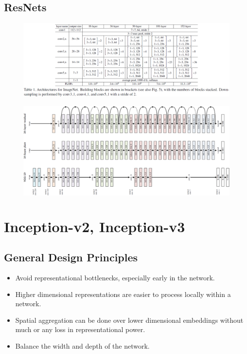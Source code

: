 \subsection{ResNets}
\begin{figure}[H]
    \centering
    \includegraphics[width=16cm]{images/models/resnets.png}
    \label{fig:resnets}
\end{figure}
\begin{figure}[H]
    \centering
    \includegraphics[width=16cm]{images/models/resnets_arch.png}
    \label{fig:resnets_arch}
\end{figure}

\section{Inception-v2, Inception-v3}
\subsection{General Design Principles}
\begin{itemize}
    \item Avoid representational bottlenecks, especially early in the network.
    \item Higher dimensional representations are easier to process locally within a network.
    \item Spatial aggregation can be done over lower dimensional embeddings without much or any loss in representational power.
    \item Balance the width and depth of the network.
\end{itemize}

